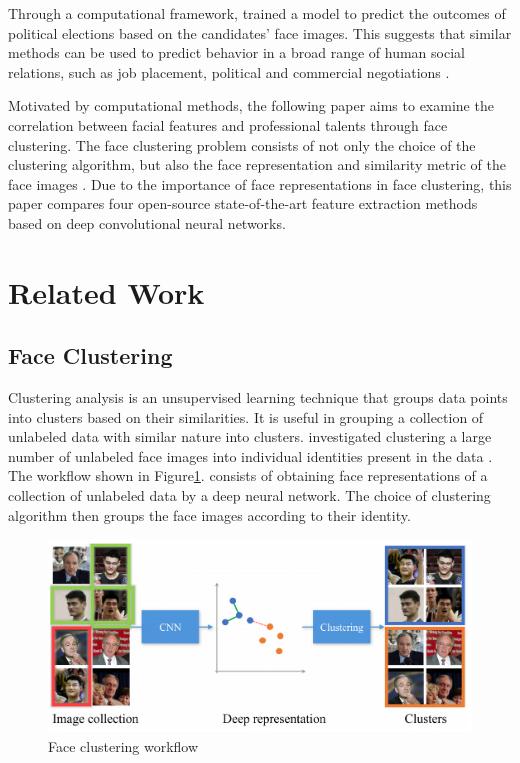 \documentclass[12pt,english]{article}
\begin{document}
Through a computational framework, \cite{joo} trained a model to predict the outcomes of political elections based on the candidates' face images. This suggests that similar methods can be used to predict behavior in a broad range of human social relations, such as job placement, political and commercial negotiations \cite{joo}.

Motivated by computational methods, the following paper aims to examine the correlation between facial features and professional talents through face clustering. The face clustering problem consists of not only the choice of the clustering algorithm, but also the face representation and similarity metric of the face images \cite{shi}. Due to the importance of face representations in face clustering, this paper compares four open-source state-of-the-art feature extraction methods based on deep convolutional neural networks.\\

\section{Related Work}	

\subsection{Face Clustering}

\quad
Clustering analysis is an unsupervised learning technique that groups data points into clusters based on their similarities. It is useful in grouping a collection of unlabeled data with similar nature into clusters. \cite{shi} investigated clustering a large number of unlabeled face images into individual identities present in the data \cite{shi}. The workflow shown in Figure\ref{fig:face}. consists of obtaining face representations of a collection of unlabeled data by a deep neural network. The choice of clustering algorithm then groups the face images according to their identity.

\begin{figure}[!tbp]
 \centering
    \includegraphics[width=\textwidth]{figures/otto_faceClustering_workflow.png}
    \caption{Face clustering workflow \cite{shi}}
	\label{fig:face}
\end{figure}
\end{document}
